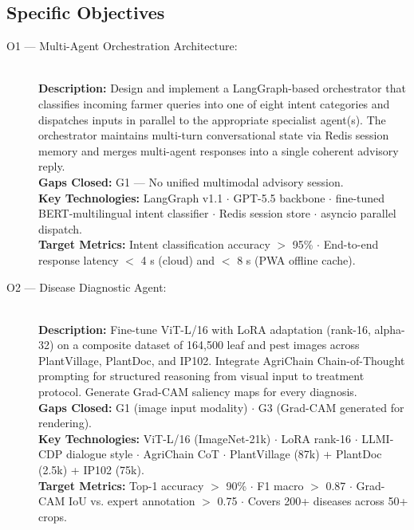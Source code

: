 \documentclass[12pt,a4paper]{article}
\begin{document}
\subsection{Specific Objectives}
\begin{description}
    \item[O1 --- Multi-Agent Orchestration Architecture:] \hfill \\
    \textbf{Description:} Design and implement a LangGraph-based orchestrator that classifies incoming farmer queries into one of eight intent categories and dispatches inputs in parallel to the appropriate specialist agent(s). The orchestrator maintains multi-turn conversational state via Redis session memory and merges multi-agent responses into a single coherent advisory reply. \\
    \textbf{Gaps Closed:} G1 --- No unified multimodal advisory session. \\
    \textbf{Key Technologies:} LangGraph v1.1 $\cdot$ GPT-5.5 backbone $\cdot$ fine-tuned BERT-multilingual intent classifier $\cdot$ Redis session store $\cdot$ asyncio parallel dispatch. \\
    \textbf{Target Metrics:} Intent classification accuracy $>$ 95\% $\cdot$ End-to-end response latency $<$ 4 s (cloud) and $<$ 8 s (PWA offline cache).

    \item[O2 --- Disease Diagnostic Agent:] \hfill \\
    \textbf{Description:} Fine-tune ViT-L/16 with LoRA adaptation (rank-16, alpha-32) on a composite dataset of 164,500 leaf and pest images across PlantVillage, PlantDoc, and IP102. Integrate AgriChain Chain-of-Thought prompting for structured reasoning from visual input to treatment protocol. Generate Grad-CAM saliency maps for every diagnosis. \\
    \textbf{Gaps Closed:} G1 (image input modality) $\cdot$ G3 (Grad-CAM generated for rendering). \\
    \textbf{Key Technologies:} ViT-L/16 (ImageNet-21k) $\cdot$ LoRA rank-16 $\cdot$ LLMI-CDP dialogue style $\cdot$ AgriChain CoT $\cdot$ PlantVillage (87k) + PlantDoc (2.5k) + IP102 (75k). \\
    \textbf{Target Metrics:} Top-1 accuracy $>$ 90\% $\cdot$ F1 macro $>$ 0.87 $\cdot$ Grad-CAM IoU vs. expert annotation $>$ 0.75 $\cdot$ Covers 200+ diseases across 50+ crops.


\end{description}
\end{document}
